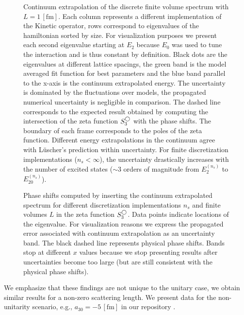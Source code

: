 \begin{figure}[htb]
\scalebox{1.0}{}
\caption{
    \label{fig:continuum-extrapolation-spectrum}
    Continuum extrapolation of the discrete finite volume spectrum with $L=1\,[\mathrm{fm}]$.
    Each column represents a different implementation of the Kinetic operator, rows correspond to eigenvalues of the hamiltonian sorted by size.
    For visualization purposes we present each second eigenvalue starting at $E_2$ because $E_0$ was used to tune the interaction and is thus constant by definition.
    Black dots are the eigenvalues at different lattice spacings, the green band is the model averaged fit function for best parameters and the blue band parallel to the x-axis is the continuum extrapolated energy.
    The uncertainty is dominated by the fluctuations over models, the propagated numerical uncertainty is negligible in comparison.
    The dashed line corresponds to the expected result obtained by computing the intersection of the zeta function $S^{\bigcirc}_3$ with the phase shifts.
    The boundary of each frame corresponds to the poles of the zeta function.
    Different energy extrapolations in the continuum agree with Lüscher's prediction within uncertainty.
    For finite discretization implementations ($n_s < \infty$), the uncertainty drastically increases with the number of excited states ($\sim 3$ orders of magnitude from $E_2^{(n_s)}$ to $E_{20}^{(n_s)}$).
}
\end{figure}


\begin{figure}[hbt]
    \scalebox{1.0}{}
    \caption{
        \label{fig:continuum-extrapolation-ere}
        Phase shifts computed by inserting the continuum extrapolated spectrum for different discretization implementations $n_s$ and finite volumes $L$ in the zeta function $S^{\bigcirc}_3$.
        Data points indicate locations of the eigenvalue.
        For visualization reasons we express the propagated error associated with continuum extrapolation as an uncertainty band.
        The black dashed line represents physical phase shifts.
        Bands stop at different $x$ values because we stop presenting results after uncertainties become too large (but are still consistent with the physical phase shifts).
        }
\end{figure}


We emphasize that these findings are not unique to the unitary case, we obtain similar results for a non-zero scattering length.
We present data for the non-unitarity scenario, e.g., $a_{30} = - 5 \, [\mathrm{fm}]$ in our repository \cite{luescher-nd_201}.

